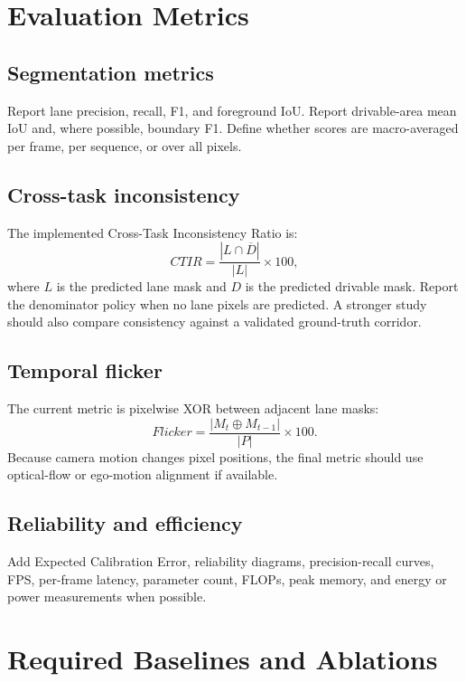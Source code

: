 \documentclass[11pt,a4paper]{article}
\begin{document}
\section{Evaluation Metrics}

\subsection{Segmentation metrics}
Report lane precision, recall, F1, and foreground IoU. Report drivable-area mean IoU and, where possible, boundary F1. Define whether scores are macro-averaged per frame, per sequence, or over all pixels.

\subsection{Cross-task inconsistency}
The implemented Cross-Task Inconsistency Ratio is:
\[
CTIR=\frac{|L\cap\overline{D}|}{|L|}\times100,
\]
where $L$ is the predicted lane mask and $D$ is the predicted drivable mask. Report the denominator policy when no lane pixels are predicted. A stronger study should also compare consistency against a validated ground-truth corridor.

\subsection{Temporal flicker}
The current metric is pixelwise XOR between adjacent lane masks:
\[
Flicker=\frac{|M_t\oplus M_{t-1}|}{|P|}\times100.
\]
Because camera motion changes pixel positions, the final metric should use optical-flow or ego-motion alignment if available.

\subsection{Reliability and efficiency}
Add Expected Calibration Error, reliability diagrams, precision-recall curves, FPS, per-frame latency, parameter count, FLOPs, peak memory, and energy or power measurements when possible.

\section{Required Baselines and Ablations}
\end{document}
